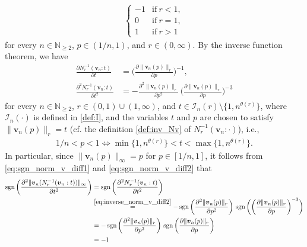 \documentclass[conference, draftcls, onecolumn]{IEEEtran}
\theoremstyle{plain}
\newcommand{\bvec}[1]{\boldsymbol{#1}}
\newcommand{\sgn}{\operatorname{sgn}}
\newcommand{\lemref}[1]{Lemma~\ref{#1}}
\begin{document}
\begin{IEEEproof}[Proof of \lemref{lem:convex_v}]
\begin{align}
\begin{cases}
-1
& \mathrm{if} \ r < 1 ,
\\
0
& \mathrm{if} \ r = 1 ,
\\
1
& \mathrm{if} \ r > 1
\end{cases}
\label{eq:sgn_norm_v_diff2}
\end{align}
for every $n \in \mathbb{N}_{\ge 2}$, $p \in (1/n, 1)$, and $r \in (0, \infty)$.
By the inverse function theorem, we have
\begin{align}
\frac{ \partial N_{r}^{-1}( \bvec{v}_{n} : t ) }{ \partial t }
& =
\bigg( \frac{ \partial \| \bvec{v}_{n}( p ) \|_{r} }{ \partial p } \bigg)^{-1} ,
\label{eq:inverse_norm_v_diff1} \\
\frac{ \partial^{2} N_{r}^{-1}( \bvec{v}_{n} : t ) }{ \partial t^{2} }
& =
- \frac{ \partial^{2} \| \bvec{v}_{n}( p ) \|_{r} }{ \partial p^{2} } \, \bigg( \frac{ \partial \| \bvec{v}_{n}( p ) \|_{r} }{ \partial p } \bigg)^{-3}
\label{eq:inverse_norm_v_diff2}
\end{align}
for every $n \in \mathbb{N}_{\ge 2}$, $r \in (0, 1) \cup (1, \infty)$, and $t \in \mathcal{I}_{n}( r ) \setminus \{ 1, n^{\theta( r )} \}$, where $\mathcal{I}_{n}( \cdot )$ is defined in \eqref{def:I}, and the variables $t$ and $p$ are chosen to satisfy $\| \bvec{
v}_{n}( p ) \|_{r} = t$ (cf. the definition \eqref{def:inv_Nv} of $N_{r}^{-1}( \bvec{v}_{n} : \cdot )$), i.e.,
\begin{align}
1/n < p < 1
\iff
\min\{ 1, n^{\theta( r )} \} < t < \max\{ 1, n^{\theta( r )} \} .
\label{eq:p_t_In}
\end{align}
In particular, since $\| \bvec{v}_{n}( p ) \|_{\infty} = p$ for $p \in [1/n, 1]$, it follows from \eqref{eq:sgn_norm_v_diff1} and \eqref{eq:sgn_norm_v_diff2} that
\begin{align}
\sgn\bigg( \frac{ \partial^{2} \| \bvec{v}_{n}( N_{r}^{-1}( \bvec{v}_{n} : t ) ) \|_{\infty} }{ \partial t^{2} } \bigg)
& =
\sgn\bigg( \frac{ \partial^{2} N_{r}^{-1}( \bvec{v}_{n} : t ) }{ \partial t^{2} } \bigg)
\\
& \overset{\eqref{eq:inverse_norm_v_diff2}}{=}
- \sgn\bigg( \frac{ \partial^{2} \| \bvec{v}_{n}( p ) \|_{r} }{ \partial p^{2} } \bigg) \, \sgn\bigg( \bigg( \frac{ \partial \| \bvec{v}_{n}( p ) \|_{r} }{ \partial p } \bigg)^{-3} \bigg)
\\
& =
- \sgn\bigg( \frac{ \partial^{2} \| \bvec{v}_{n}( p ) \|_{r} }{ \partial p^{2} } \bigg) \, \sgn\bigg( \frac{ \partial \| \bvec{v}_{n}( p ) \|_{r} }{ \partial p } \bigg)
\\
& =
- 1
\label{eq:sgn_norm_v_diff2_r_inf}
\end{align}

\end{IEEEproof}
\end{document}
